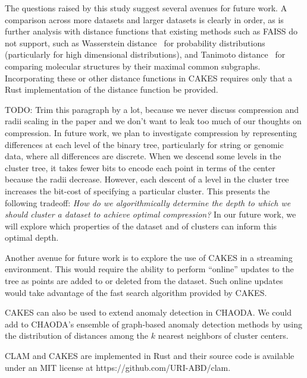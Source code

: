 The questions raised by this study suggest several avenues for future work.
A comparison across more datasets and larger datasets is clearly in order, as is further analysis with distance functions that existing methods such as FAISS do not support, such as Wasserstein distance~\cite{vallender1974calculation} for probability distributions (particularly for high dimensional distributions), and Tanimoto distance~\cite{bajusz2015tanimoto} for comparing molecular structures by their maximal common subgraphs.
Incorporating these or other distance functions in CAKES requires only that a Rust implementation of the distance function be provided.

{\color{red} TODO: Trim this paragraph by a lot, because we never discuss compression and radii scaling in the paper and we don't want to leak too much of our thoughts on compression.}
In future work, we plan to investigate compression by representing differences at each level of the binary tree, particularly for string or genomic data, where all differences are discrete.
When we descend some levels in the cluster tree, it takes fewer bits to encode each point in terms of the center because the radii decrease.
However, each descent of a level in the cluster tree increases the bit-cost of specifying a particular cluster. 
This presents the following tradeoff:
\emph{How do we algorithmically determine the depth to which we should cluster a dataset to achieve optimal compression?} 
In our future work, we will explore which properties of the dataset and of clusters can inform this optimal depth.

Another avenue for future work is to explore the use of CAKES in a streaming environment.
This would require the ability to perform ``online'' updates to the tree as points are added to or deleted from the dataset.
Such online updates would take advantage of the fast search algorithm provided by CAKES.  %

CAKES can also be used to extend anomaly detection in CHAODA.
We could add to CHAODA's ensemble of graph-based anomaly detection methods by using the distribution of distances among the $k$ nearest neighbors of cluster centers.

CLAM and CAKES are implemented in Rust and their source code is available under an MIT license at https://github.com/URI-ABD/clam.
